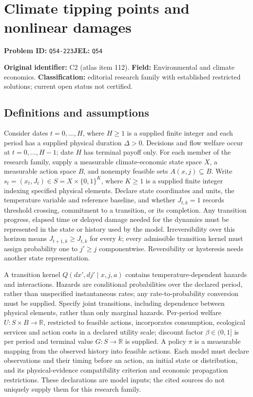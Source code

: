 \documentclass[11pt,a4paper]{article}
\newcommand{\R}{\mathbb R}
\begin{document}
\section*{Climate tipping points and nonlinear damages}
\textbf{Problem ID:} \texttt{Q54-223}\quad \textbf{JEL:} \texttt{Q54}\par
\label{problem:OP-0112}
\label{atlas:prob:C2}

\noindent\textbf{Original identifier:} C2 (atlas item 112). \textbf{Field:} Environmental and climate economics. \textbf{Classification:} editorial research family with established restricted solutions; current open status not certified.

\subsection*{Definitions and assumptions}

Consider dates $t=0,\ldots,H$, where $H\geq1$ is a supplied finite integer and each period has a supplied physical duration $\Delta>0$. Decisions and flow welfare occur at $t=0,\ldots,H-1$; date $H$ has terminal payoff only. For each member of the research family, supply a measurable climate-economic state space $X$, a measurable action space $B$, and nonempty feasible sets $A(x,j)\subseteq B$. Write $s_t=(x_t,J_t)\in S=X\times\{0,1\}^K$, where $K\geq1$ is a supplied finite integer indexing specified physical elements. Declare state coordinates and units, the temperature variable and reference baseline, and whether $J_{t,k}=1$ records threshold crossing, commitment to a transition, or its completion. Any transition progress, elapsed time or delayed damage needed for the dynamics must be represented in the state or history used by the model. Irreversibility over this horizon means $J_{t+1,k}\ge J_{t,k}$ for every $k$; every admissible transition kernel must assign probability one to $j'\geq j$ componentwise. Reversibility or hysteresis needs another state representation.

A transition kernel $Q(dx',dj'\mid x,j,a)$ contains temperature-dependent hazards and interactions. Hazards are conditional probabilities over the declared period, rather than unspecified instantaneous rates; any rate-to-probability conversion must be supplied. Specify joint transitions, including dependence between physical elements, rather than only marginal hazards. Per-period welfare $U:S\times B\to\R$, restricted to feasible actions, incorporates consumption, ecological services and action costs in a declared utility scale; discount factor $\beta\in(0,1]$ is per period and terminal value $G:S\to\R$ is supplied. A policy $\pi$ is a measurable mapping from the observed history into feasible actions. Each model must declare observations and their timing before an action, an initial state or distribution, and its physical-evidence compatibility criterion and economic propagation restrictions. These declarations are model inputs; the cited sources do not uniquely supply them for this research family.
\end{document}
